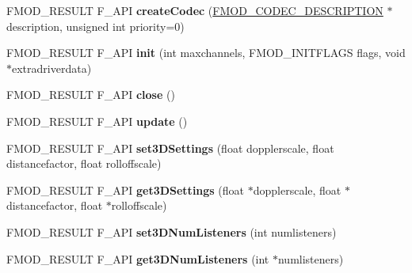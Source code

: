 \begin{DoxyCompactItemize}
\item 
F\+M\+O\+D\+\_\+\+R\+E\+S\+U\+LT F\+\_\+\+A\+PI {\bfseries create\+Codec} (\hyperlink{struct_f_m_o_d___c_o_d_e_c___d_e_s_c_r_i_p_t_i_o_n}{F\+M\+O\+D\+\_\+\+C\+O\+D\+E\+C\+\_\+\+D\+E\+S\+C\+R\+I\+P\+T\+I\+ON} $\ast$description, unsigned int priority=0)\hypertarget{class_f_m_o_d_1_1_system_a6855d31fda8b1b9318c15498762c2380}{}\label{class_f_m_o_d_1_1_system_a6855d31fda8b1b9318c15498762c2380}

\item 
F\+M\+O\+D\+\_\+\+R\+E\+S\+U\+LT F\+\_\+\+A\+PI {\bfseries init} (int maxchannels, F\+M\+O\+D\+\_\+\+I\+N\+I\+T\+F\+L\+A\+GS flags, void $\ast$extradriverdata)\hypertarget{class_f_m_o_d_1_1_system_a0f8f7c5f25875362ff9d822ca894857a}{}\label{class_f_m_o_d_1_1_system_a0f8f7c5f25875362ff9d822ca894857a}

\item 
F\+M\+O\+D\+\_\+\+R\+E\+S\+U\+LT F\+\_\+\+A\+PI {\bfseries close} ()\hypertarget{class_f_m_o_d_1_1_system_af8b6c4c677e44197657893de01383169}{}\label{class_f_m_o_d_1_1_system_af8b6c4c677e44197657893de01383169}

\item 
F\+M\+O\+D\+\_\+\+R\+E\+S\+U\+LT F\+\_\+\+A\+PI {\bfseries update} ()\hypertarget{class_f_m_o_d_1_1_system_a52538b2fe55918c1575ff22bbfab48d6}{}\label{class_f_m_o_d_1_1_system_a52538b2fe55918c1575ff22bbfab48d6}

\item 
F\+M\+O\+D\+\_\+\+R\+E\+S\+U\+LT F\+\_\+\+A\+PI {\bfseries set3\+D\+Settings} (float dopplerscale, float distancefactor, float rolloffscale)\hypertarget{class_f_m_o_d_1_1_system_a107414e588b619f0883570efa92da2ca}{}\label{class_f_m_o_d_1_1_system_a107414e588b619f0883570efa92da2ca}

\item 
F\+M\+O\+D\+\_\+\+R\+E\+S\+U\+LT F\+\_\+\+A\+PI {\bfseries get3\+D\+Settings} (float $\ast$dopplerscale, float $\ast$distancefactor, float $\ast$rolloffscale)\hypertarget{class_f_m_o_d_1_1_system_a3d437ae627c22704714a274c310b8966}{}\label{class_f_m_o_d_1_1_system_a3d437ae627c22704714a274c310b8966}

\item 
F\+M\+O\+D\+\_\+\+R\+E\+S\+U\+LT F\+\_\+\+A\+PI {\bfseries set3\+D\+Num\+Listeners} (int numlisteners)\hypertarget{class_f_m_o_d_1_1_system_a33a3a5b785baf3eb09a7428ea2beb495}{}\label{class_f_m_o_d_1_1_system_a33a3a5b785baf3eb09a7428ea2beb495}

\item 
F\+M\+O\+D\+\_\+\+R\+E\+S\+U\+LT F\+\_\+\+A\+PI {\bfseries get3\+D\+Num\+Listeners} (int $\ast$numlisteners)\hypertarget{class_f_m_o_d_1_1_system_a6909226f2d3f918a3a6900e35476cdbc}{}\label{class_f_m_o_d_1_1_system_a6909226f2d3f918a3a6900e35476cdbc}


\end{DoxyCompactItemize}
